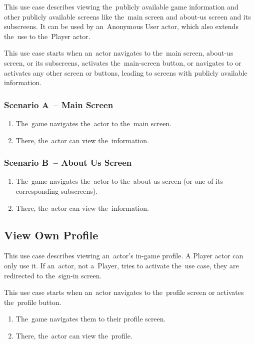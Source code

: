 This use case describes viewing the~publicly available game information and other publicly available screens like the~main screen and about-us screen and its subscreens.
It can be used by an~Anonymous User actor, which also extends the~use to the~Player actor.

This use case starts when an~actor navigates to the~main screen, about-us screen, or its subscreens, activates the~main-screen button, or navigates to or activates any other screen or buttons, leading to screens with publicly available information.

\subsubsection*{Scenario A~-- Main Screen}

\begin{enumerate}
    \item The~game navigates the~actor to the~main screen.
    \item There, the~actor can view the~information.
\end{enumerate}

\subsubsection*{Scenario B~-- About Us Screen}

\begin{enumerate}
    \item The~game navigates the~actor to the~about us screen (or one of its corresponding subscreens).
    \item There, the~actor can view the~information.
\end{enumerate}

\subsection{View Own Profile}

This use case describes viewing an~actor's in-game profile.
A Player actor can only use it.
If an~actor, not a~Player, tries to activate the~use case, they are redirected to the~sign-in screen.

This use case starts when an~actor navigates to the~profile screen or activates the~profile button.

\begin{enumerate}
    \item The~game navigates them to their profile screen.
    \item There, the~actor can view the~profile.
\end{enumerate}

